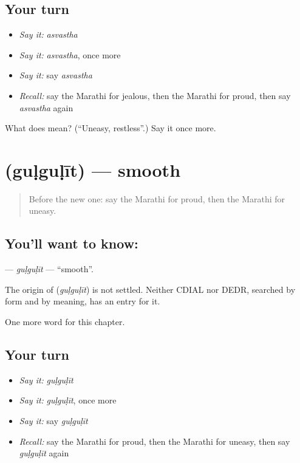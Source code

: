 \subsection*{Your turn}
\begin{itemize}
\raggedright
  \item \emph{Say it:} \emph{asvastha}
  \item \emph{Say it:} \emph{asvastha}, once more
  \item \emph{Say it:} say \emph{asvastha}
  \item \emph{Recall:} say the Marathi for jealous, then the Marathi for proud, then say \emph{asvastha} again
\end{itemize}

\begin{tcolorbox}[breakable,colback=teal!4,colframe=teal!35!black,title={Before you move on}]
What does  mean? (\textquotedblleft{}Uneasy, restless\textquotedblright{}.) Say it once more.
\end{tcolorbox}
\section[\texorpdfstring{\mr{गुळगुळीत} (guḷguḷīt)}{गुळगुळीत (guḷguḷīt)}]{ (guḷguḷīt) — smooth}

\label{lesson:MR-C232-gulgulit}



\begin{quote}
Before the new one: say the Marathi for proud, then the Marathi for uneasy.
\end{quote}

\subsection*{You'll want to know: }
\textbf{} — \emph{guḷguḷīt} — \textquotedblleft{}smooth\textquotedblright{}.

\begin{cousinweb}
The origin of \textbf{} (\emph{guḷguḷīt}) is not settled. Neither CDIAL nor DEDR, searched by form and by meaning, has an entry for it.
\end{cousinweb}

\begin{grammarlens}[title={What you've built}]
One more word for this chapter.
\end{grammarlens}

\subsection*{Your turn}
\begin{itemize}
\raggedright
  \item \emph{Say it:} \emph{guḷguḷīt}
  \item \emph{Say it:} \emph{guḷguḷīt}, once more
  \item \emph{Say it:} say \emph{guḷguḷīt}
  \item \emph{Recall:} say the Marathi for proud, then the Marathi for uneasy, then say \emph{guḷguḷīt} again
\end{itemize}

